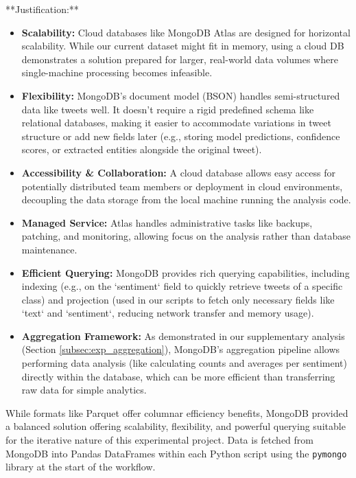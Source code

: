 \documentclass[10pt,twocolumn]{article}
\begin{document}
**Justification:**
\begin{itemize}[leftmargin=*, itemsep=0pt, topsep=3pt]
    \item \textbf{Scalability:} Cloud databases like MongoDB Atlas are designed for horizontal scalability. While our current dataset might fit in memory, using a cloud DB demonstrates a solution prepared for larger, real-world data volumes where single-machine processing becomes infeasible.
    \item \textbf{Flexibility:} MongoDB's document model (BSON) handles semi-structured data like tweets well. It doesn't require a rigid predefined schema like relational databases, making it easier to accommodate variations in tweet structure or add new fields later (e.g., storing model predictions, confidence scores, or extracted entities alongside the original tweet).
    \item \textbf{Accessibility \& Collaboration:} A cloud database allows easy access for potentially distributed team members or deployment in cloud environments, decoupling the data storage from the local machine running the analysis code.
    \item \textbf{Managed Service:} Atlas handles administrative tasks like backups, patching, and monitoring, allowing focus on the analysis rather than database maintenance. %
    \item \textbf{Efficient Querying:} MongoDB provides rich querying capabilities, including indexing (e.g., on the `sentiment` field to quickly retrieve tweets of a specific class) and projection (used in our scripts to fetch only necessary fields like `text` and `sentiment`, reducing network transfer and memory usage). %
    \item \textbf{Aggregation Framework:} As demonstrated in our supplementary analysis (Section \ref{subsec:exp_aggregation}), MongoDB's aggregation pipeline allows performing data analysis (like calculating counts and averages per sentiment) directly within the database, which can be more efficient than transferring raw data for simple analytics. %
\end{itemize}

While formats like Parquet offer columnar efficiency benefits, MongoDB provided a balanced solution offering scalability, flexibility, and powerful querying suitable for the iterative nature of this experimental project. Data is fetched from MongoDB into Pandas DataFrames within each Python script using the \texttt{pymongo} library at the start of the workflow.
\end{document}
